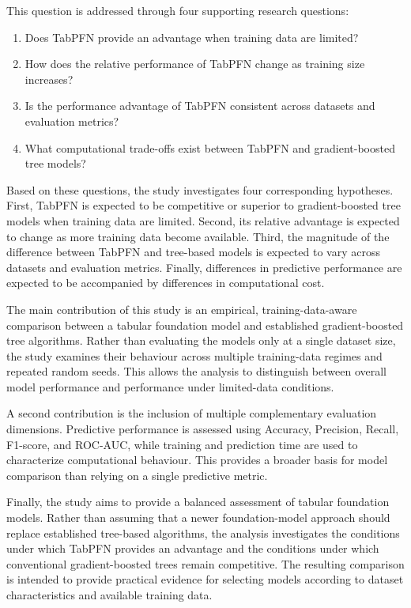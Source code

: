 This question is addressed through four supporting research questions:

\begin{enumerate}
\def\labelenumi{\arabic{enumi}.}
\tightlist
\item
  Does TabPFN provide an advantage when training data are limited?
\item
  How does the relative performance of TabPFN change as training size increases?
\item
  Is the performance advantage of TabPFN consistent across datasets and evaluation metrics?
\item
  What computational trade-offs exist between TabPFN and gradient-boosted tree models?
\end{enumerate}

Based on these questions, the study investigates four corresponding hypotheses. First, TabPFN is expected to be competitive or superior to gradient-boosted tree models when training data are limited. Second, its relative advantage is expected to change as more training data become available. Third, the magnitude of the difference between TabPFN and tree-based models is expected to vary across datasets and evaluation metrics. Finally, differences in predictive performance are expected to be accompanied by differences in computational cost.

The main contribution of this study is an empirical, training-data-aware comparison between a tabular foundation model and established gradient-boosted tree algorithms. Rather than evaluating the models only at a single dataset size, the study examines their behaviour across multiple training-data regimes and repeated random seeds. This allows the analysis to distinguish between overall model performance and performance under limited-data conditions.

A second contribution is the inclusion of multiple complementary evaluation dimensions. Predictive performance is assessed using Accuracy, Precision, Recall, F1-score, and ROC-AUC, while training and prediction time are used to characterize computational behaviour. This provides a broader basis for model comparison than relying on a single predictive metric.

Finally, the study aims to provide a balanced assessment of tabular foundation models. Rather than assuming that a newer foundation-model approach should replace established tree-based algorithms, the analysis investigates the conditions under which TabPFN provides an advantage and the conditions under which conventional gradient-boosted trees remain competitive. The resulting comparison is intended to provide practical evidence for selecting models according to dataset characteristics and available training data.
